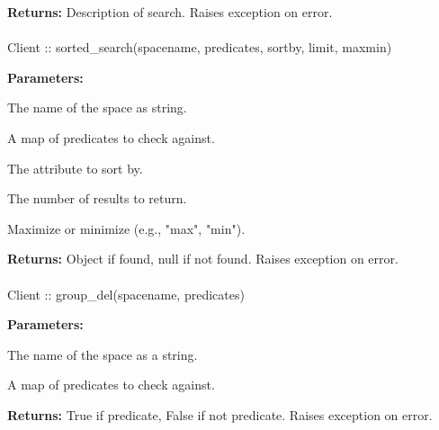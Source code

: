 \noindent\textbf{Returns:}
Description of search.  Raises exception on error.

\paragraph{}
\label{api:java:sorted_search}
\begin{javacode}
Client :: sorted_search(spacename, predicates, sortby, limit, maxmin)
\end{javacode}
\funcdesc 

\noindent\textbf{Parameters:}
\begin{description}[labelindent=\widthof{{\code{predicates}}},leftmargin=*,noitemsep,nolistsep,align=right]
\item[\code{spacename}] The name of the space as string.
\item[\code{predicates}] A map of predicates to check against.
\item[\code{sortby}] The attribute to sort by.
\item[\code{limit}] The number of results to return.
\item[\code{maxmin}] Maximize or minimize (e.g., "max", "min").
\end{description}

\noindent\textbf{Returns:}
Object if found, null if not found.  Raises exception on error.

\paragraph{}
\label{api:java:group_del}
\begin{javacode}
Client :: group_del(spacename, predicates)
\end{javacode}
\funcdesc 

\noindent\textbf{Parameters:}
\begin{description}[labelindent=\widthof{{\code{predicates}}},leftmargin=*,noitemsep,nolistsep,align=right]
\item[\code{spacename}] The name of the space as a string.
\item[\code{predicates}] A map of predicates to check against.
\end{description}

\noindent\textbf{Returns:}
True if predicate, False if not predicate.  Raises exception on error.

